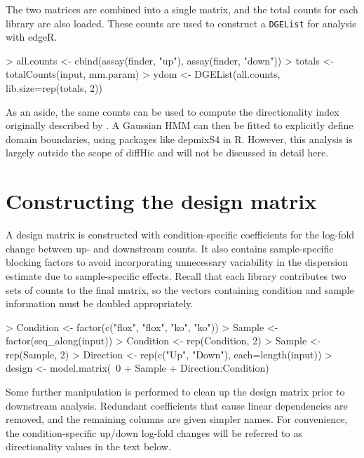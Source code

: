 \documentclass[12pt]{report}
\renewenvironment{Schunk}{\vspace{0pt}}{\vspace{0pt}}
\newcommand{\edgeR}{edgeR}
\newcommand{\pkgname}{diffHic}
\newcommand{\code}[1]{{\small\texttt{#1}}}
\newcommand{\R}{\textsf{R}}
\begin{document}
The two matrices are combined into a single matrix, and the total counts for each library are also loaded.
These counts are used to construct a \code{DGEList} for analysis with \edgeR{}. 

\begin{Schunk}
\begin{Sinput}
> all.counts <- cbind(assay(finder, "up"), assay(finder, "down"))
> totals <- totalCounts(input, mm.param)
> ydom <- DGEList(all.counts, lib.size=rep(totals, 2))
\end{Sinput}
\end{Schunk}

As an aside, the same counts can be used to compute the directionality index originally described by \cite{dixon2012topological}. 
A Gaussian HMM can then be fitted to explicitly define domain boundaries, using packages like depmixS4 in \R{}.
However, this analysis is largely outside the scope of \pkgname{} and will not be discussed in detail here.

\section{Constructing the design matrix}
A design matrix is constructed with condition-specific coefficients for the log-fold change between up- and downstream counts.
It also contains sample-specific blocking factors to avoid incorporating unnecessary variability in the dispersion estimate due to sample-specific effects.
Recall that each library contributes two sets of counts to the final matrix, so the vectors containing condition and sample information must be doubled appropriately.

\begin{Schunk}
\begin{Sinput}
> Condition <- factor(c("flox", "flox", "ko", "ko"))
> Sample <- factor(seq_along(input))
> Condition <- rep(Condition, 2)
> Sample <- rep(Sample, 2)
> Direction <- rep(c("Up", "Down"), each=length(input))
> design <- model.matrix(~0 + Sample + Direction:Condition)
\end{Sinput}
\end{Schunk}

Some further manipulation is performed to clean up the design matrix prior to downstream analysis.
Redundant coefficients that cause linear dependencies are removed, and the remaining columns are given simpler names.
For convenience, the condition-specific up/down log-fold changes will be referred to as directionality values in the text below.
\end{document}
